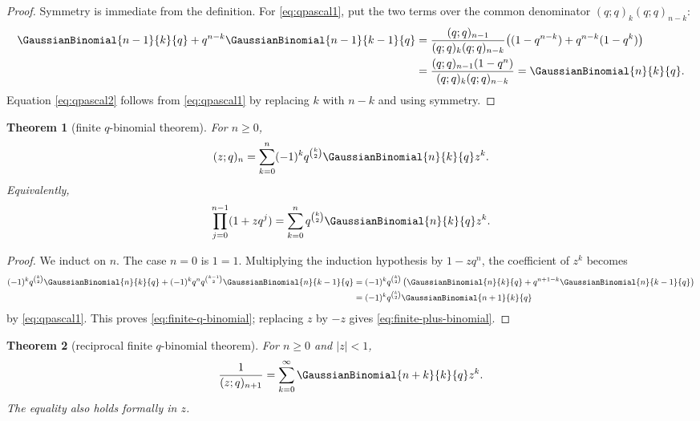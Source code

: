 \documentclass[11pt,oneside]{article}
\newtheorem{theorem}{Theorem}[section]
\theoremstyle{definition}
\begin{document}
\begin{proof}
Symmetry is immediate from the definition. For \eqref{eq:qpascal1}, put the two terms over the common denominator $(q;q)_k(q;q)_{n-k}$:
\begin{align*}
 \GaussianBinomial{n-1}{k}{q}+q^{n-k}\GaussianBinomial{n-1}{k-1}{q}
 &=\frac{(q;q)_{n-1}}{(q;q)_k(q;q)_{n-k}}
   \bigl((1-q^{n-k})+q^{n-k}(1-q^k)\bigr)\\
 &=\frac{(q;q)_{n-1}(1-q^n)}{(q;q)_k(q;q)_{n-k}}
 =\GaussianBinomial{n}{k}{q}.
\end{align*}
Equation \eqref{eq:qpascal2} follows from \eqref{eq:qpascal1} by replacing $k$ with $n-k$ and using symmetry.
\end{proof}

\begin{theorem}[finite $q$-binomial theorem]\label{thm:finite-q-binomial}
For $n\ge0$,
\begin{equation}\label{eq:finite-q-binomial}
 (z;q)_n=\sum_{k=0}^{n}(-1)^kq^{\binom k2}\GaussianBinomial{n}{k}{q} z^k.
\end{equation}
Equivalently,
\begin{equation}\label{eq:finite-plus-binomial}
 \prod_{j=0}^{n-1}(1+zq^j)=
 \sum_{k=0}^{n}q^{\binom k2}\GaussianBinomial{n}{k}{q} z^k.
\end{equation}
\end{theorem}

\begin{proof}
We induct on $n$. The case $n=0$ is $1=1$. Multiplying the induction hypothesis by $1-zq^n$, the coefficient of $z^k$ becomes
\begin{align*}
 (-1)^kq^{\binom k2}\GaussianBinomial{n}{k}{q}
 +(-1)^kq^nq^{\binom{k-1}2}\GaussianBinomial{n}{k-1}{q}
 &=(-1)^kq^{\binom k2}
   \left(\GaussianBinomial{n}{k}{q}+q^{n+1-k}\GaussianBinomial{n}{k-1}{q}\right)\\
 &=(-1)^kq^{\binom k2}\GaussianBinomial{n+1}{k}{q}
\end{align*}
by \eqref{eq:qpascal1}. This proves \eqref{eq:finite-q-binomial}; replacing $z$ by $-z$ gives \eqref{eq:finite-plus-binomial}.
\end{proof}

\begin{theorem}[reciprocal finite $q$-binomial theorem]\label{thm:reciprocal-finite}
For $n\ge0$ and $|z|<1$,
\begin{equation}\label{eq:reciprocal-finite}
 \frac{1}{(z;q)_{n+1}}=
 \sum_{k=0}^{\infty}\GaussianBinomial{n+k}{k}{q}z^k.
\end{equation}
The equality also holds formally in $z$.
\end{theorem}
\end{document}
